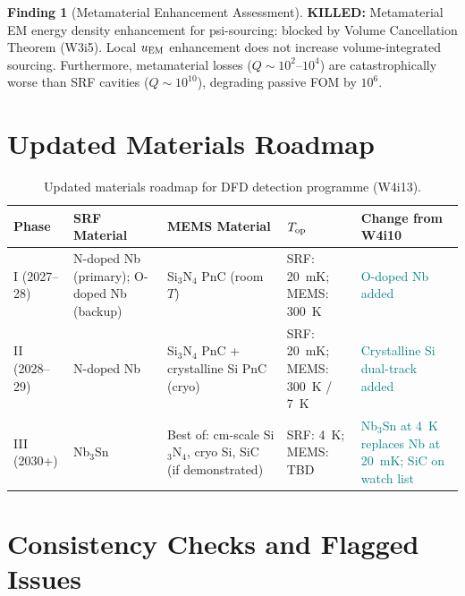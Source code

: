 \documentclass[11pt]{article}
\theoremstyle{definition}
\newtheorem{finding}[theorem]{Finding}
\theoremstyle{remark}
\newcommand{\killed}[1]{\textcolor{red!70!black}{\textbf{KILLED:} #1}}
\begin{document}
\begin{finding}[Metamaterial Enhancement Assessment]
\label{find:metamaterial}
\killed{Metamaterial EM energy density enhancement for psi-sourcing:
blocked by Volume Cancellation Theorem (W3i5). Local $u_{\rm EM}$
enhancement does not increase volume-integrated sourcing.
Furthermore, metamaterial losses ($Q \sim 10^2$--$10^4$) are
catastrophically worse than SRF cavities ($Q \sim 10^{10}$),
degrading passive FOM by $10^6$.}
\end{finding}


\section{Updated Materials Roadmap}
\label{sec:roadmap}

\begin{table}[H]
\centering
\caption{Updated materials roadmap for DFD detection programme (W4i13).}
\label{tab:roadmap}
\renewcommand{\arraystretch}{1.3}
\begin{tabular}{p{2cm}p{3cm}p{2.5cm}p{2cm}p{3cm}}
\toprule
\textbf{Phase} & \textbf{SRF Material} & \textbf{MEMS Material} &
\textbf{$T_{\rm op}$} & \textbf{Change from W4i10} \\
\midrule
I (2027--28) &
  N-doped Nb (primary); O-doped Nb (backup) &
  Si$_3$N$_4$ PnC (room $T$) &
  SRF: 20~mK; MEMS: 300~K &
  \textcolor{teal}{O-doped Nb added} \\
\midrule
II (2028--29) &
  N-doped Nb &
  Si$_3$N$_4$ PnC + crystalline Si PnC (cryo) &
  SRF: 20~mK; MEMS: 300~K / 7~K &
  \textcolor{teal}{Crystalline Si dual-track added} \\
\midrule
III (2030+) &
  Nb$_3$Sn &
  Best of: cm-scale Si$_3$N$_4$, cryo Si, SiC (if demonstrated) &
  SRF: 4~K; MEMS: TBD &
  \textcolor{teal}{Nb$_3$Sn at 4~K replaces Nb at 20~mK; SiC on
  watch list} \\
\bottomrule
\end{tabular}
\end{table}


\section{Consistency Checks and Flagged Issues}
\label{sec:consistency}
\end{document}
